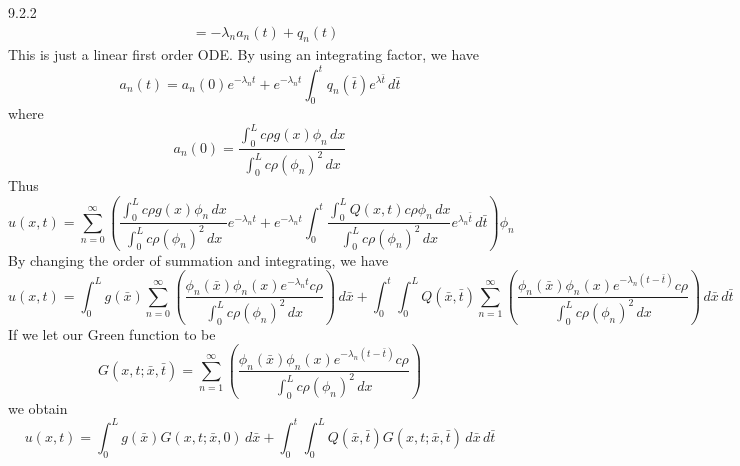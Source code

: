 \documentclass{article}
\theoremstyle{definition}
\begin{document}
\begin{prob}{9.2.2}
\begin{align*}
            &= -\lambda_n a_n(t) + q_n(t)
        \end{align*}
        This is just a linear first order ODE. By using an integrating factor, we have
        \[
            a_n(t) = a_n(0)e^{-\lambda_n t} + e^{-\lambda_n t} \int_0^t q_n(\bar{t}) e^{\lambda \bar{t}} \, d\bar{t}
        \]
        where
        \[
            a_n(0) = \dfrac{ \int_0^L c\rho g(x)\phi_n \, dx}{ \int_0^L c\rho (\phi_n)^2 \, dx}
        \]
        Thus
        \[
            u(x,t) = \sum\limits_{n=0}^{\infty} \left( \dfrac{ \int_0^L c\rho g(x)\phi_n \, dx}{ \int_0^L c\rho (\phi_n)^2 \, dx} e^{-\lambda_n t} + e^{-\lambda_n t} \int_0^t \dfrac{ \int_0^L Q(x,t)c\rho\phi_n \, dx}{ \int_0^L c\rho(\phi_n)^2 \,dx} e^{\lambda_n \bar{t}} \, d\bar{t} \right)\phi_n
        \]
        By changing the order of summation and integrating, we have
        \[
            u(x,t) = \int_0^L g(\bar{x}) \sum\limits_{n=0}^{\infty} \left( \frac{\phi_n(\bar{x})\phi_n(x) e^{-\lambda_n t} c\rho}{\int_0^L c\rho (\phi_n)^2 \, dx} \right) \, d\bar{x} + \int_0^t \int_0^L Q(\bar{x},\bar{t}) \sum\limits_{n=1}^{\infty}\left( \frac{\phi_n(\bar{x})\phi_n(x) e^{-\lambda_n (t-\bar{t})} c\rho}{\int_0^L c\rho (\phi_n)^2 \, dx} \right) \, d\bar{x} \, d\bar{t}
        \]
        If we let our Green function to be
        \[
            G(x,t;\bar{x},\bar{t}) = \sum\limits_{n=1}^{\infty}\left( \frac{\phi_n(\bar{x})\phi_n(x) e^{-\lambda_n (t-\bar{t})} c\rho}{\int_0^L c\rho (\phi_n)^2 \, dx} \right)
        \]
        we obtain
        \[
            \boxed{ u(x,t) = \int_0^L g(\bar{x}) G(x,t;\bar{x},0) \, d\bar{x} + \int_0^t \int_0^L Q(\bar{x},\bar{t})G(x,t;\bar{x},\bar{t}) \, d\bar{x} \, d\bar{t} }
        \]
        $ $
    \end{prob}
    
\end{document}
